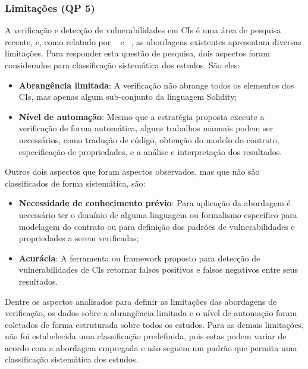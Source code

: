 \subsubsection*{\textbf{Limitações (QP 5)}}

A verificação e detecção de vulnerabilidades em CIs é uma área de pesquisa recente, e, como relatado por ~ e ~, as abordagens existentes apresentam diversas limitações. Para responder esta questão de pesquisa, dois aspectos foram considerados para classificação sistemática dos estudos. São eles:

\begin{itemize}
    \item \textbf{Abrangência limitada}: A verificação não abrange todos os elementos dos CIs, mas apenas algum sub-conjunto da linguagem Solidity;
    \item \textbf{Nível de automação}: Mesmo que a estratégia proposta execute a verificação de forma automática, alguns trabalhos manuais podem ser necessários, como tradução de código, obtenção do modelo do contrato, especificação de propriedades, e a análise e interpretação dos resultados.
\end{itemize}

Outros dois aspectos que foram aspectos observados, mas que não são classificados de forma sistemática, são:

\begin{itemize}
    \item \textbf{Necessidade de conhecimento prévio}: Para aplicação da abordagem é necessário ter o domínio de alguma linguagem ou formalismo específico para modelagem do contrato ou para definição dos padrões de vulnerabilidades e propriedades a serem verificadas;
    \item \textbf{Acurácia}: A ferramenta ou framework proposto para detecção de vulnerabilidades de CIs retornar falsos positivos e falsos negativos entre seus resultados.
\end{itemize}

Dentre os aspectos analisados para definir as limitações das abordagens de verificação, os dados sobre a abrangência limitada e o nível de automação foram coletados de forma estruturada sobre todos os estudos. Para as demais limitações, não foi estabelecida uma classificação predefinida, pois estas podem variar de acordo com a abordagem empregada e não seguem um padrão que permita uma classificação sistemática dos estudos.

